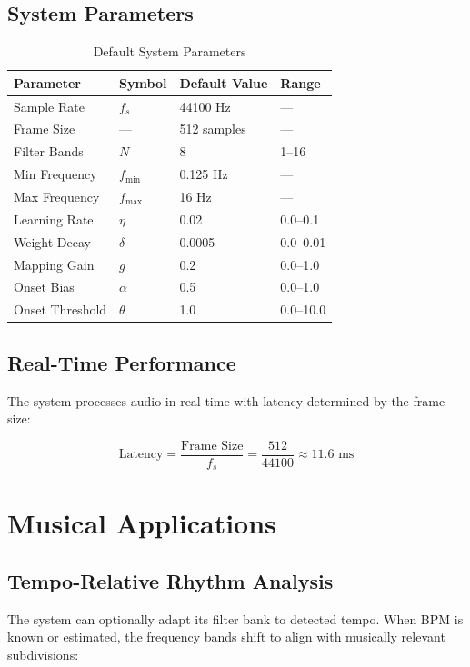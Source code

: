 \documentclass[11pt,a4paper]{article}
\begin{document}
\subsection{System Parameters}

\begin{table}[h]
\centering
\caption{Default System Parameters}
\begin{tabular}{@{}llll@{}}
\toprule
Parameter & Symbol & Default Value & Range \\ \midrule
Sample Rate & $f_s$ & 44100 Hz & --- \\
Frame Size & --- & 512 samples & --- \\
Filter Bands & $N$ & 8 & 1--16 \\
Min Frequency & $f_{\min}$ & 0.125 Hz & --- \\
Max Frequency & $f_{\max}$ & 16 Hz & --- \\
Learning Rate & $\eta$ & 0.02 & 0.0--0.1 \\
Weight Decay & $\delta$ & 0.0005 & 0.0--0.01 \\
Mapping Gain & $g$ & 0.2 & 0.0--1.0 \\
Onset Bias & $\alpha$ & 0.5 & 0.0--1.0 \\
Onset Threshold & $\theta$ & 1.0 & 0.0--10.0 \\ \bottomrule
\end{tabular}
\end{table}

\subsection{Real-Time Performance}

The system processes audio in real-time with latency determined by the frame size:

\begin{equation}
\text{Latency} = \frac{\text{Frame Size}}{f_s} = \frac{512}{44100} \approx 11.6 \text{ ms}
\end{equation}

\section{Musical Applications}

\subsection{Tempo-Relative Rhythm Analysis}

The system can optionally adapt its filter bank to detected tempo. When BPM is known or estimated, the frequency bands shift to align with musically relevant subdivisions:
\end{document}
